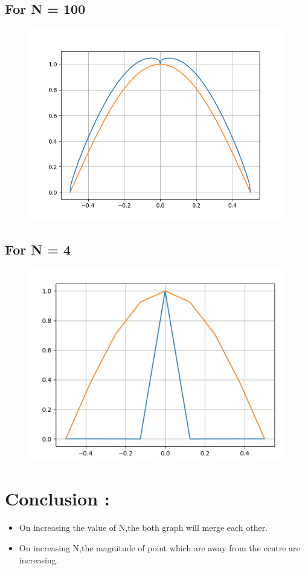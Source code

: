 \documentclass[11pt,a4paper]{article}
\begin{document}
\subsection{ For N = 100}
\begin{figure}[H]
\centering
\includegraphics[scale=0.6]{Figure_1.png}
\label{fig:Time domain output of step input}
\end{figure}

\subsection{ For N = 4}
\begin{figure}[H]
\centering
\includegraphics[scale=0.6]{Figure_2.jpeg}
\label{fig:Time domain output of step input}
\end{figure}

\section{Conclusion :}
\begin{itemize}

\item On increasing the value of N,the both graph will merge each other.
\item On increasing N,the magnitude of point which are away from the centre are increasing.
\end{itemize}
\end{document}

